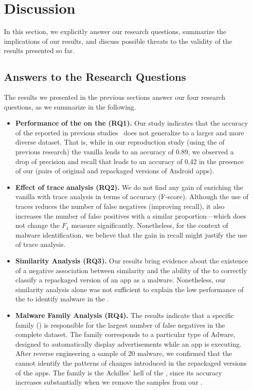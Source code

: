 \section{Discussion}

In this section, we explicitly answer our research questions,
summarize the implications of our results, and discuss possible
threats to the validity of the results presented so far.

\subsection{Answers to the Research Questions}

The results we presented in the previous sections
 answer our four research questions, as
we summarize in the following.

\begin{itemize}
\item \textbf{Performance of the \mas on the \cds (RQ1).} 
  Our study indicates that the accuracy of the \mas reported in previous studies~\cite{DBLP:conf/wcre/BaoLL18,DBLP:journals/jss/CostaMMSSBNR22} does not
  generalize to a larger and more diverse dataset. That is, while in our
  reproduction study (using the \sds of previous research) the vanilla \mas
  leads to an accuracy of 0.89, we observed a drop of precision and recall
  that leads to an accuracy of 0.42 in the presence of our \cds (\apps pairs of
  original and repackaged versions of Android apps). 

\item \textbf{Effect of trace analysis (RQ2).} We do not find any gain of enriching the vanilla \mas with
  trace analysis in terms of accuracy (F-score). Although the use of traces
  reduces the number of false negatives (improving recall), it also increases the number of false
  positives with a similar proportion---which does not change the $F_1$ measure significantly.
  Nonetheless, for the context of malware identification, we believe that the
  gain in recall might justify the use of trace analysis.

\item \textbf{Similarity Analysis (RQ3).} Our results bring evidence about the existence of a negative
  association between similarity and the ability of the \mas to correctly
  classify a repackaged version of an app as a malware. Nonetheless,
  our similarity analysis alone was not sufficient to explain the low
  performance of the \mas to identify malware in the \cds.

\item \textbf{Malware Family Analysis (RQ4).} The results indicate that a specific family
  (\gps)  is responsible for the largest number of false
  negatives in the complete dataset. The \gps family corresponds to a particular type of
  Adware, designed to automatically display advertisements while an app is executing. After reverse engineering
  a sample of 20 \gps malware, we confirmed that the \mas cannot identify the
  patterns of changes introduced in the repackaged versions of the apps. The \gps family
  is the Achilles' hell of the \mas, since its accuracy increases substantially
  when we remove the \gps samples from our \cds.  
\end{itemize}


